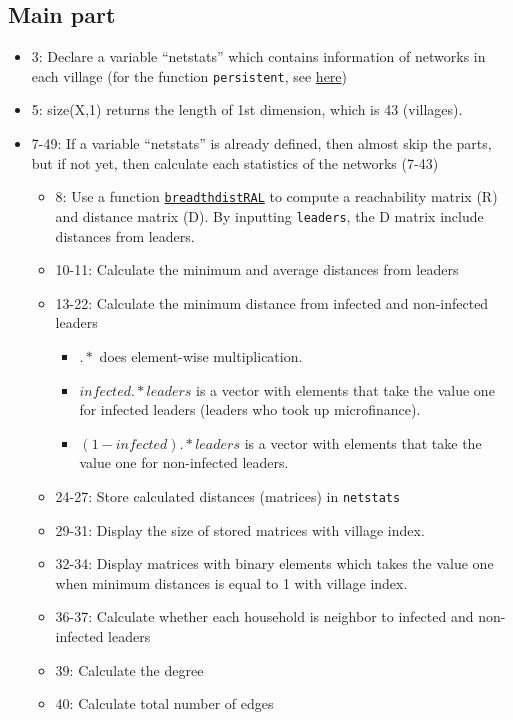 \documentclass[10pt,letterpaper]{article}
\begin{document}
\subsection*{Main part}
\begin{itemize}
  \item 3: Declare a variable ``netstats'' which contains information of networks in each village (for the function \texttt{persistent}, see \href{https://www.mathworks.com/help/matlab/ref/persistent.html}{here})
  \item 5: size(X,1) returns the length of 1st dimension, which is 43 (villages).
  \item 7-49: If a variable ``netstats'' is already defined, then almost skip the parts, but if not yet, then calculate each statistics of the networks (7-43)
    \begin{itemize}
      \item 8: Use a function \hyperref[breadthdistRAL]{\texttt{breadthdistRAL}} to compute a reachability matrix (R) and distance matrix (D). By inputting \texttt{leaders}, the D matrix include distances from leaders. 
      \item 10-11: Calculate the minimum and average distances from leaders
      \item 13-22: Calculate the minimum distance from infected and non-infected leaders
      	\begin{itemize}
      		\item $.*$ does element-wise multiplication. 
      		\item $infected.*leaders$ is a vector with elements that take the value one for infected leaders (leaders who took up microfinance). 
      		\item $(1-infected).*leaders$ is a vector with elements that take the value one for non-infected leaders.
      	\end{itemize}
      \item 24-27: Store calculated distances (matrices) in \texttt{netstats}
      \item 29-31: Display the size of stored matrices with village index.
      \item 32-34: Display matrices with binary elements which takes the value one when minimum distances is equal to 1 with village index.
      \item 36-37: Calculate whether each household is neighbor to infected and non-infected leaders
      \item 39: Calculate the degree
      \item 40: Calculate total number of edges

\end{itemize}
\end{itemize}
\end{document}
